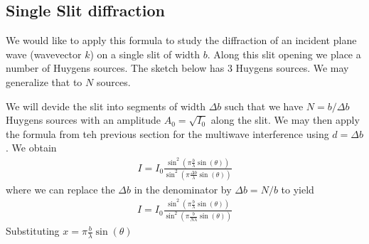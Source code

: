\documentclass[letterpaper,10pt,english]{sphinxmanual}
\let\sphinxpxdimen\pdfpxdimen\else\newdimen\sphinxpxdimen
\begin{document}
\subsection{Single Slit diffraction}
\label{\detokenize{notebooks/L12/Diffraction:Single-Slit-diffraction}}
We would like to apply this formula to study the diffraction of an incident plane wave (wavevector \(k\)) on a single slit of width \(b\). Along this slit opening we place a number of Huygens sources. The sketch below has 3 Huygens sources. We may generalize that to \(N\) sources.



\sphinxincludegraphics[width=400\sphinxpxdimen]{{single_slit}.png}








We will devide the slit into segments of width \(\Delta b\) such that we have \(N=b/\Delta b\) Huygens sources with an amplitude \(A_0=\sqrt{I_0}\) along the slit. We may then apply the formula from teh previous section for the multi\sphinxhyphen{}wave interference using \(d=\Delta b\). We obtain
\begin{equation*}
\begin{split}I=I_0 \frac{\sin^2\left (\pi\frac{b}{\lambda}\sin(\theta)\right)}{\sin^2\left (\pi\frac{\Delta b}{\lambda}\sin(\theta)\right)}\end{split}
\end{equation*}
where we can replace the \(\Delta b\) in the denominator by \(\Delta b=N/b\) to yield
\begin{equation*}
\begin{split}I=I_0 \frac{\sin^2\left (\pi\frac{b}{\lambda}\sin(\theta)\right)}{\sin^2\left (\pi\frac{b}{N\lambda}\sin(\theta)\right)}\end{split}
\end{equation*}
Substituting \(x=\pi \frac{b}{\lambda}\sin(\theta)\)
\end{document}
